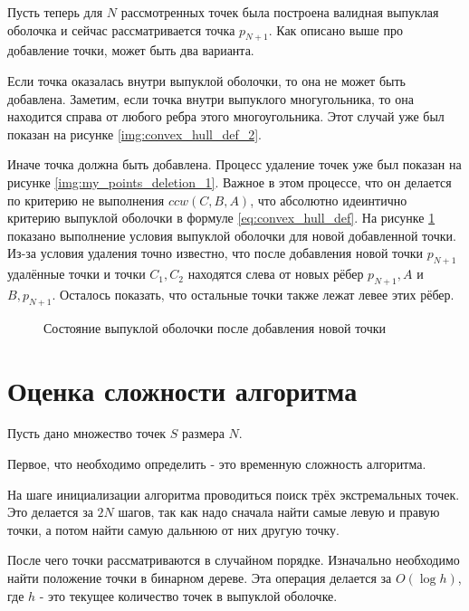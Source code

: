 Пусть теперь для $N$ рассмотренных точек была построена валидная выпуклая оболочка и сейчас рассматривается точка $p_{N+1}$. Как описано выше про добавление точки, может быть два варианта.

Если точка оказалась внутри выпуклой оболочки, то она не может быть добавлена. Заметим, если точка внутри выпуклого многугольника, то она находится справа от любого ребра этого многоугольника. Этот случай уже был показан на рисунке \ref{img:convex_hull_def_2}.

Иначе точка должна быть добавлена. Процесс удаление точек уже был показан на рисунке \ref{img:my_points_deletion_1}. Важное в этом процессе, что он делается по критерию не выполнения $ccw(C, B, A)$, что абсолютно идеинтично критерию выпуклой оболочки в формуле \ref{eq:convex_hull_def}. На рисунке \ref{img:my_proof} показано выполнение условия выпуклой оболочки для новой добавленной точки. Из-за условия удаления точно известно, что после добавления новой точки $p_{N+1}$ удалённые точки и точки $C_1, C_2$ находятся слева от новых рёбер $p_{N+1}, A$ и $B, p_{N+1}$. Осталось показать, что остальные точки также лежат левее этих рёбер.


\begin{figure}[H]
	\centering
	
	\caption{Состояние выпуклой оболочки после добавления новой точки}
	\label{img:my_proof}
\end{figure}

\section{Оценка сложности алгоритма} \label{subsect2_4}


Пусть дано множество точек $S$ размера $N$.

Первое, что необходимо определить - это временную сложность алгоритма.

На шаге инициализации алгоритма проводиться поиск трёх экстремальных точек. Это делается за $2 N$ шагов, так как надо сначала найти самые левую и правую точки, а потом найти самую дальнюю от них другую точку.

После чего точки рассматриваются в случайном порядке. Изначально необходимо найти положение точки в бинарном дереве. Эта операция делается за $O(\log h)$, где $h$ - это текущее количество точек в выпуклой оболочке.

